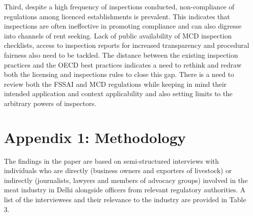 \documentclass[a4paper, 12pt]{article}
\begin{document}
Third, despite a high frequency of inspections conducted, non-compliance of regulations among licenced establishments is prevalent. This indicates that inspections are often ineffective in promoting compliance and can also digresse into channels of rent seeking. Lack of public availability of MCD inspection checklists, access to inspection reports for increased transparency and procedural fairness also need to be tackled. The distance between the existing inspection practices and the OECD best practices indicates a need to rethink and redraw both the licensing and inspections rules to close this gap. There is a need to review both the FSSAI and MCD regulations while keeping in mind their intended application and context applicability and also setting limits to the arbitrary powers of inspectors. \\


\printbibliography[title={Bibliography}]

\newpage 
\small
\section*{Appendix 1: Methodology}
The findings in the paper are based on semi-structured interviews with individuals who are directly (business owners and exporters of livestock) or indirectly (journalists, lawyers and members of advocacy groups) involved in the meat industry in Delhi alongside officers from relevant regulatory authorities. A list of the interviewees and their relevance to the industry are provided in Table 3. 
 
\end{document}
